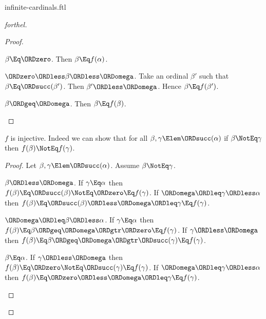 \documentclass{stex}
\begin{document}
\begin{smodule}{infinite-cardinals.ftl}
\begin{proof}[forthel]
\begin{proof}
    \begin{case}{$\beta \Eq \ORDzero$.}
      Then $\beta \Eq f(\alpha)$.
    \end{case}

    \begin{case}{$\ORDzero \ORDless \beta \ORDless \ORDomega$.}
      Take an ordinal $\beta'$ such that $\beta \Eq \ORDsucc(\beta')$.
      Then $\beta' \ORDless \ORDomega$.
      Hence $\beta \Eq f(\beta')$.
    \end{case}

    \begin{case}{$\beta \ORDgeq \ORDomega$.}
      Then $\beta \Eq f(\beta)$.
    \end{case}
  \end{proof}

  $f$ is injective.
  Indeed we can show that for all $\beta, \gamma \Elem \ORDsucc(\alpha)$ if
  $\beta \NotEq \gamma$ then $f(\beta) \NotEq f(\gamma)$.
  \begin{proof}
    Let $\beta, \gamma \Elem \ORDsucc(\alpha)$.
    Assume $\beta \NotEq \gamma$.

    \begin{case}{$\beta \ORDless \ORDomega$.}
      If $\gamma \Eq \alpha$ then
      $f(\beta)
        \Eq \ORDsucc(\beta)
        \NotEq \ORDzero
        \Eq f(\gamma)$.
      If $\ORDomega \ORDleq \gamma \ORDless \alpha$ then
      $f(\beta)
        \Eq \ORDsucc(\beta)
        \ORDless \ORDomega
        \ORDleq \gamma
        \Eq f(\gamma)$.
    \end{case}

    \begin{case}{$\ORDomega \ORDleq \beta \ORDless \alpha$.}
      If $\gamma \Eq \alpha$ then
      $f(\beta)
        \Eq \beta
        \ORDgeq \ORDomega
        \ORDgtr \ORDzero
        \Eq f(\gamma)$.
      If $\gamma \ORDless \ORDomega$ then
      $f(\beta)
        \Eq \beta
        \ORDgeq \ORDomega
        \ORDgtr \ORDsucc(\gamma)
        \Eq f(\gamma)$.
    \end{case}

    \begin{case}{$\beta \Eq \alpha$.}
      If $\gamma \ORDless \ORDomega$ then
      $f(\beta)
        \Eq \ORDzero
        \NotEq \ORDsucc(\gamma)
        \Eq f(\gamma)$.
      If $\ORDomega \ORDleq \gamma \ORDless \alpha$ then
      $f(\beta)
        \Eq \ORDzero
        \ORDless \ORDomega
        \ORDleq \gamma
        \Eq f(\gamma)$.
    \end{case}
  \end{proof}


\end{proof}
\end{smodule}
\end{document}
